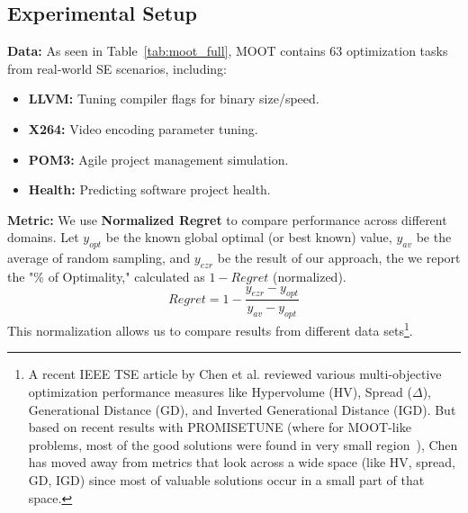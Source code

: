 \documentclass[pdflatex,sn-basic]{sn-jnl}
\begin{document}
\subsection{Experimental Setup}
\textbf{Data:} As seen in Table~\ref{tab:moot_full},
MOOT contains 63 optimization tasks from real-world SE scenarios, 
including:
\begin{itemize}
    \item \textbf{LLVM:} Tuning compiler flags for binary size/speed.
    \item \textbf{X264:} Video encoding parameter tuning.
    \item \textbf{POM3:} Agile project management simulation.
    \item \textbf{Health:} Predicting software project health.
\end{itemize}

\textbf{Metric:} We use \textbf{Normalized Regret} to compare performance 
across different domains. Let $y_{opt}$ be the known global optimal (or best 
known) value, $y_{av}$ be the average of random sampling, and $y_{ezr}$ 
be the result of our approach, the we 
 report the "\% of Optimality," calculated as $1 - Regret$ (normalized).
\begin{equation}\label{regret}
    Regret = 1 - \frac{y_{ezr} - y_{opt}}{y_{av} - y_{opt}}
\end{equation}
This normalization allows us to compare results from different data sets\footnote{A recent  IEEE TSE article by Chen et al. \citep{ref41} reviewed various multi-objective optimization performance measures like Hypervolume (HV), Spread ($\Delta$), Generational Distance (GD), and Inverted Generational Distance (IGD).
But based on recent results with   PROMISETUNE   (where for MOOT-like problems, most of the good solutions were found in very small region~\citep{Chen26Promise}), Chen has moved away from    metrics that look across a wide space (like HV, spread, GD, IGD)  since most of  valuable solutions occur in a small part of that space.}.

\end{document}
